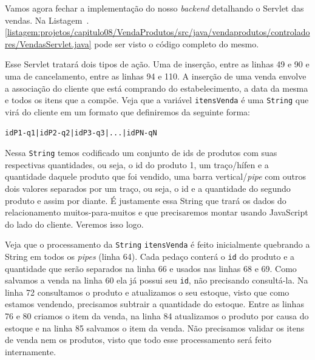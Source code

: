 Vamos agora fechar a implementação do nosso \textit{backend} detalhando o Servlet das vendas. Na Listagem~\thechapter.\ref{listagem:projetos/capitulo08/VendaProdutos/src/java/vendaprodutos/controladores/VendasServlet.java} pode ser visto o código completo do mesmo.


Esse Servlet tratará dois tipos de ação. Uma de inserção, entre as linhas 49 e 90 e uma de cancelamento, entre as linhas 94 e 110. A inserção de uma venda envolve a associação do cliente que está comprando do estabelecimento, a data da mesma e todos os itens que a compõe. Veja que a variável \texttt{itensVenda} é uma \texttt{String} que virá do cliente em um formato que definiremos da seguinte forma:

\texttt{idP1-q1|idP2-q2|idP3-q3|...|idPN-qN}

Nessa \texttt{String} temos codificado um conjunto de ids de produtos com suas respectivas quantidades, ou seja, o id do produto 1, um traço/hífen e a quantidade daquele produto que foi vendido, uma barra vertical/\textit{pipe} com outros dois valores separados por um traço, ou seja, o id e a quantidade do segundo produto e assim por diante. É justamente essa String que trará os dados do relacionamento muitos-para-muitos e que precisaremos montar usando JavaScript do lado do cliente. Veremos isso logo.

Veja que o processamento da \texttt{String} \texttt{itensVenda} é feito inicialmente quebrando a String em todos os \textit{pipes} (linha 64). Cada pedaço conterá o \texttt{id} do produto e a quantidade que serão separados na linha 66 e usados nas linhas 68 e 69. Como salvamos a venda na linha 60 ela já possui seu \texttt{id}, não precisando consultá-la. Na linha 72 consultamos o produto e atualizamos o seu estoque, visto que como estamos vendendo, precisamos subtrair a quantidade do estoque. Entre as linhas 76 e 80 criamos o item da venda, na linha 84 atualizamos o produto por causa do estoque e na linha 85 salvamos o item da venda. Não precisamos validar os itens de venda nem os produtos, visto que todo esse processamento será feito internamente.

